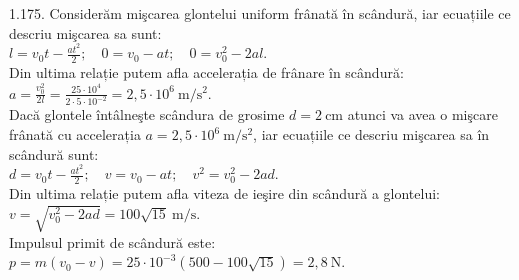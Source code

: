 1.175. Considerăm mişcarea glontelui uniform frânată în scândură, iar ecuațiile ce descriu mişcarea sa sunt:\\ $l=v_{0} t-\frac{a t^{2}}{2}; \quad 0=v_{0}-a t; \quad 0=v_{0}^{2}-2 a l$.\\ Din ultima relație putem afla accelerația de frânare în scândură:\\ $a=\frac{v_{0}^{2}}{2 l}=\frac{25 \cdot 10^{4}}{2 \cdot 5 \cdot 10^{-2}}=2,5 \cdot 10^{6} \mathrm{~m} / \mathrm{s}^{2}$.\\ Dacă glontele întâlneşte scândura de grosime $d=2 \mathrm{~cm}$ atunci va avea o mişcare frânată cu accelerația $a=2,5 \cdot 10^{6} \mathrm{~m} / \mathrm{s}^{2}$, iar ecuațiile ce descriu mişcarea sa în scândură sunt:\\ $d=v_{0} t-\frac{a t^{2}}{2}; \quad v=v_{0}-a t; \quad v^{2}=v_{0}^{2}-2 a d$.\\ Din ultima relație putem afla viteza de ieşire din scândură a glontelui:\\ $v=\sqrt{v_{0}^{2}-2 a d}=100 \sqrt{15} \mathrm{~m} / \mathrm{s}$.\\ Impulsul primit de scândură este:\\ $p=m\left(v_{0}-v\right)=25 \cdot 10^{-3}(500-100 \sqrt{15})=2,8 \mathrm{~N}$.\\

